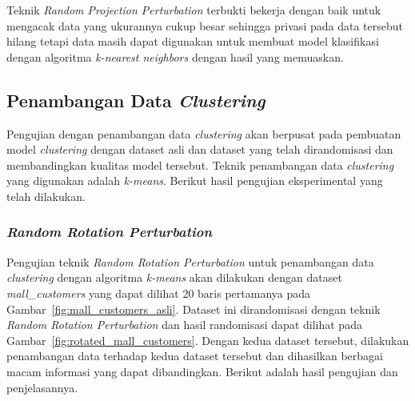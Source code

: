 Teknik \textit{Random Projection Perturbation} terbukti bekerja dengan baik untuk mengacak data yang ukurannya cukup besar sehingga privasi pada data tersebut hilang tetapi data masih dapat digunakan untuk membuat model klasifikasi dengan algoritma \textit{k-nearest neighbors} dengan hasil yang memuaskan.

\subsection{Penambangan Data \textit{Clustering}}
\label{sec:pengujian-clustering}

Pengujian dengan penambangan data \textit{clustering} akan berpusat pada pembuatan model \textit{clustering} dengan dataset asli dan dataset yang telah dirandomisasi dan membandingkan kualitas model tersebut. Teknik penambangan data \textit{clustering} yang digunakan adalah \textit{k-means}. Berikut hasil pengujian eksperimental yang telah dilakukan.

\subsubsection{\textit{Random Rotation Perturbation}}
\label{sec:pengujian-clustering-rrp}

Pengujian teknik \textit{Random Rotation Perturbation} untuk penambangan data \textit{clustering} dengan algoritma \textit{k-means} akan dilakukan dengan dataset \textit{mall\_customers} yang dapat dilihat 20 baris pertamanya pada Gambar~\ref{fig:mall_customers_asli}. Dataset ini dirandomisasi dengan teknik \textit{Random Rotation Perturbation} dan hasil randomisasi dapat dilihat pada Gambar~\ref{fig:rotated_mall_customers}. Dengan kedua dataset tersebut, dilakukan penambangan data terhadap kedua dataset tersebut dan dihasilkan berbagai macam informasi yang dapat dibandingkan. Berikut adalah hasil pengujian dan penjelasannya.

